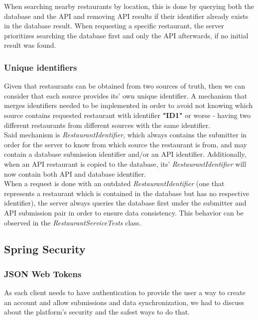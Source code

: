 When searching nearby restaurants by location, this is done by querying both the database and the API and removing API results if their
identifier already exists in the database result. When requesting a specific restaurant, the server prioritizes searching the database
first and only the API afterwards, if no initial result was found.\\

\subsubsection{Unique identifiers}

Given that restaurants can be obtained from two sources of truth, then we can consider that each source provides its' own unique identifier.
A mechanism that merges identifiers needed to be implemented in order to avoid not knowing which source contains requested restaurant with
identifier \textbf{"ID1"} or worse - having two different restaurants from different sources with the same identifier.\\

Said mechanism is \textit{RestaurantIdentifier}, which always contains the submitter in order for the server to know from which source the restaurant
is from, and may contain a database submission identifier and/or an API identifier. Additionally, when an API restaurant is copied to the database,
its' \textit{RestaurantIdentifier} will now contain both API and database identifier.\\

When a request is done with an outdated \textit{RestaurantIdentifier} (one that represents a restaurant which is contained in the database but has no respective
identifier), the server always queries the database first under the submitter and API submission pair in order to ensure data consistency. This behavior
can be observed in the \textit{RestaurantServiceTests} class.

\subsection{Spring Security}

\subsubsection{JSON Web Tokens}

As each client needs to have authentication to provide the user a way to create an account and allow submissions and data synchronization,
we had to discuss about the platform's security and the safest ways to do that.\\

